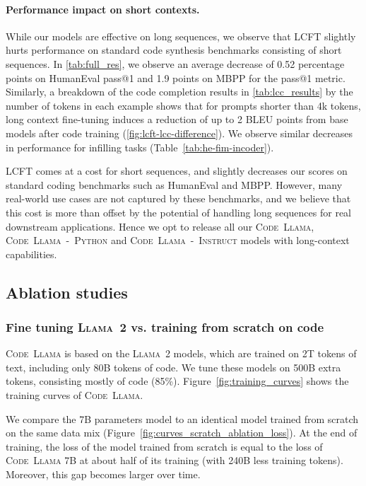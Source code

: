 \paragraph{Performance impact on short contexts.} While our models are effective on long sequences, we observe that LCFT slightly hurts performance on standard code synthesis benchmarks consisting of short sequences. In \ref{tab:full_res}, we observe an average decrease of 0.52 percentage points on HumanEval pass@1 and 1.9 points on MBPP for the pass@1 metric. Similarly, a breakdown of the code completion results in \ref{tab:lcc_results} by the number of tokens in each example shows that for prompts shorter than 4k tokens, long context fine-tuning induces a reduction of up to 2 BLEU points from base models after code training (\ref{fig:lcft-lcc-difference}).
We observe similar decreases in performance for infilling tasks (Table~\ref{tab:he-fim-incoder}).

LCFT comes at a cost for short sequences, and slightly decreases our scores on standard coding benchmarks such as HumanEval and MBPP. However, many real-world use cases are not captured by these benchmarks, and we believe that this cost is more than offset by the potential of handling long sequences for real downstream applications. Hence we opt to release all our \textsc{Code~Llama}, \textsc{Code~Llama~-~Python} and \textsc{Code~Llama~-~Instruct} models with long-context capabilities.

\subsection{Ablation studies}

\subsubsection{Fine tuning \textsc{Llama~2} vs. training from scratch on code}\label{sec:scratch}

\textsc{Code~Llama} is based on the \textsc{Llama~2} models, which are trained on 2T tokens of text, including only 80B tokens of code. We tune these models on 500B extra tokens, consisting mostly of code (85\%). 
Figure~\ref{fig:training_curves} shows the training curves of \textsc{Code~Llama}. 

We compare the 7B parameters model to an identical model trained from scratch on the same data mix (Figure~\ref{fig:curves_scratch_ablation_loss}). At the end of training, the loss of the model trained from scratch is equal to the loss of \textsc{Code~Llama} 7B at about half of its training (with 240B less training tokens). Moreover, this gap becomes larger over time. 

